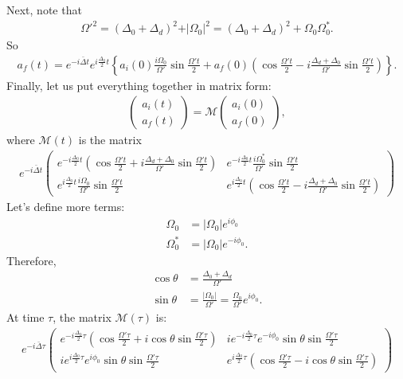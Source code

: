 \documentclass{article}
\begin{document}
Next, note that
\begin{align}
\Omega'^2 = (\Delta_0 + \Delta_d)^2 + \vert\Omega_0\vert^2 = (\Delta_0 + \Delta_d)^2 + \Omega_0\Omega^*_0.
\end{align}
So
\begin{align}
\boxed{a_f(t) = e^{-i\bar{\Delta}t}e^{i\frac{\Delta_0}{2}t}\left\{
a_i(0)\frac{i\Omega_0}{\Omega'}\sin\frac{\Omega't}{2} + 
a_f(0)\left(\cos\frac{\Omega't}{2}-i\frac{\Delta_d + \Delta_0}{\Omega'}\sin\frac{\Omega't}{2} \right)  \right\}}.
\end{align}
Finally, let us put everything together in matrix form:
\begin{align}
\begin{pmatrix}
a_i(t)\\a_f(t)
\end{pmatrix} = 
\mathcal{M}\begin{pmatrix}
a_i(0)\\a_f(0)
\end{pmatrix},
\end{align}
where $\mathcal{M}(t)$ is the matrix
\begin{align}
\boxed{e^{-i\bar{\Delta}t}
\begin{pmatrix}
e^{-i\frac{\Delta_0}{2}t}\left(\cos\frac{\Omega't}{2} + i\frac{\Delta_d + \Delta_0}{\Omega'}\sin\frac{\Omega't}{2} \right) & e^{-i\frac{\Delta_0}{2}t}\frac{i\Omega^*_0}{\Omega'}\sin\frac{\Omega't}{2}\\
e^{i\frac{\Delta_0}{2}t}\frac{i\Omega_0}{\Omega'}\sin\frac{\Omega't}{2} & e^{i\frac{\Delta_0}{2}t}\left(\cos\frac{\Omega't}{2}-i\frac{\Delta_d + \Delta_0}{\Omega'}\sin\frac{\Omega't}{2} \right)
\end{pmatrix}}
\end{align}
Let's define more terms:
\begin{align}
\Omega_0 &= \vert\Omega_0\vert e^{i\phi_0}\nonumber\\
\Omega^*_0 &= \vert\Omega_0\vert e^{-i\phi_0}.
\end{align}
Therefore,
\begin{align}
\cos\theta &= \frac{\Delta_0 + \Delta_d}{\Omega'}\nonumber\\
\sin\theta &= \frac{\vert \Omega_0\vert}{\Omega'} = \frac{\Omega_0}{\Omega'}e^{i\phi_0}.
\end{align}
At time $\tau$, the matrix $\mathcal{M}(\tau)$ is:
\begin{align}
e^{-i\bar{\Delta}\tau}\begin{pmatrix}
e^{-i\frac{\Delta_0}{2}\tau}\left(\cos\frac{\Omega'\tau}{2} + i\cos\theta\sin\frac{\Omega'\tau}{2} \right) & ie^{-i\frac{\Delta_0}{2}\tau}e^{-i\phi_0}\sin\theta\sin\frac{\Omega'\tau}{2}\\
ie^{i\frac{\Delta_0}{2}\tau}e^{i\phi_0}\sin\theta\sin\frac{\Omega'\tau}{2} & e^{i\frac{\Delta_0}{2}\tau}\left(\cos\frac{\Omega'\tau}{2}-i\cos\theta\sin\frac{\Omega'\tau}{2} \right)
\end{pmatrix}
\end{align}
\end{document}
